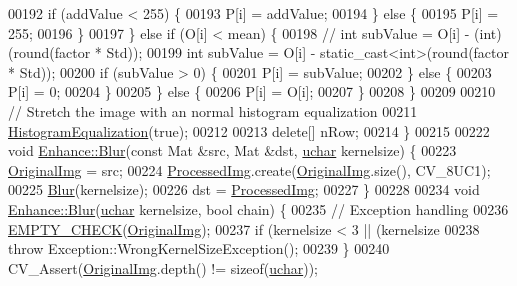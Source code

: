 \begin{DoxyCode}
00192       \textcolor{keywordflow}{if} (addValue < 255) \{
00193         P[i] = addValue;
00194       \} \textcolor{keywordflow}{else} \{
00195         P[i] = 255;
00196       \}
00197     \} \textcolor{keywordflow}{else} \textcolor{keywordflow}{if} (O[i] < mean) \{
00198       \textcolor{comment}{// int subValue = O[i] - (int)(round(factor * Std));}
00199       \textcolor{keywordtype}{int} subValue = O[i] - \textcolor{keyword}{static\_cast<}\textcolor{keywordtype}{int}\textcolor{keyword}{>}(round(factor * Std));
00200       \textcolor{keywordflow}{if} (subValue > 0) \{
00201         P[i] = subValue;
00202       \} \textcolor{keywordflow}{else} \{
00203         P[i] = 0;
00204       \}
00205     \} \textcolor{keywordflow}{else} \{
00206       P[i] = O[i];
00207     \}
00208   \}
00209 
00210   \textcolor{comment}{// Stretch the image with an normal histogram equalization}
00211   \hyperlink{class_vision_1_1_enhance_aa22bf01c06e941aa40e0075fac9aad8f}{HistogramEqualization}(\textcolor{keyword}{true});
00212 
00213   \textcolor{keyword}{delete}[] nRow;
00214 \}
00215 
00222 \textcolor{keywordtype}{void} \hyperlink{class_vision_1_1_enhance_a5062a7481326dce9ab7ece19bc3b44c9}{Enhance::Blur}(\textcolor{keyword}{const} Mat &src, Mat &dst, \hyperlink{_soil_math_types_8h_a65f85814a8290f9797005d3b28e7e5fc}{uchar} kernelsize) \{
00223   \hyperlink{class_vision_1_1_image_processing_a77c370dab270158a4e9c634e2d3f48e7}{OriginalImg} = src;
00224   \hyperlink{class_vision_1_1_image_processing_aa7d65742882cd1b2a1e4e9cb68809211}{ProcessedImg}.create(\hyperlink{class_vision_1_1_image_processing_a77c370dab270158a4e9c634e2d3f48e7}{OriginalImg}.size(), CV\_8UC1);
00225   \hyperlink{class_vision_1_1_enhance_a5062a7481326dce9ab7ece19bc3b44c9}{Blur}(kernelsize);
00226   dst = \hyperlink{class_vision_1_1_image_processing_aa7d65742882cd1b2a1e4e9cb68809211}{ProcessedImg};
00227 \}
00228 
00234 \textcolor{keywordtype}{void} \hyperlink{class_vision_1_1_enhance_a5062a7481326dce9ab7ece19bc3b44c9}{Enhance::Blur}(\hyperlink{_soil_math_types_8h_a65f85814a8290f9797005d3b28e7e5fc}{uchar} kernelsize, \textcolor{keywordtype}{bool} chain) \{
00235   \textcolor{comment}{// Exception handling}
00236   \hyperlink{_image_processing_8h_a27c4e53b88a0f9f2c097add555131056}{EMPTY\_CHECK}(\hyperlink{class_vision_1_1_image_processing_a77c370dab270158a4e9c634e2d3f48e7}{OriginalImg});
00237   \textcolor{keywordflow}{if} (kernelsize < 3 || (kernelsize %
00238     \textcolor{keywordflow}{throw} Exception::WrongKernelSizeException();
00239   \}
00240   CV\_Assert(\hyperlink{class_vision_1_1_image_processing_a77c370dab270158a4e9c634e2d3f48e7}{OriginalImg}.depth() != \textcolor{keyword}{sizeof}(\hyperlink{_soil_math_types_8h_a65f85814a8290f9797005d3b28e7e5fc}{uchar}));

\end{DoxyCode}
